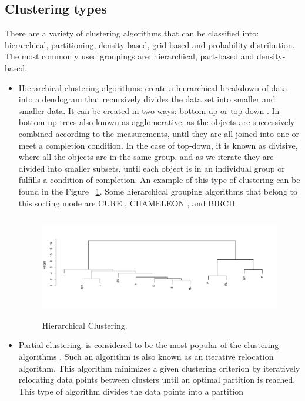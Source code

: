 \subsection{Clustering types}

There are a variety of clustering algorithms that can be classified into: hierarchical, partitioning, density-based, grid-based and probability distribution. The most commonly used groupings are: hierarchical, part-based and density-based.
\\
\begin{itemize}
  \item Hierarchical clustering algorithms: create a hierarchical breakdown of data into a dendogram that recursively divides the data set into smaller and smaller data. It can be created in two ways: bottom-up or top-down \citep{b19}. In bottom-up trees also known as agglomerative, as the objects are successively combined according to the measurements, until they are all joined into one or meet a completion condition.  In the case of top-down, it is known as divisive, where all the objects are in the same group, and as we iterate they are divided into smaller subsets, until each object is in an individual group or fulfills a condition of completion. An example of this type of clustering can be found in the Figure ~\ref{fig:hierarchical}. Some hierarchical grouping algorithms that belong to this sorting mode are CURE \citep{b20}, CHAMELEON \citep{b21}, and BIRCH \citep{b22}.
\begin{figure}[htbp]
  \centering
   \includegraphics[width=14cm, height=4.5cm]{img/hierarchical.pdf}
    \caption{Hierarchical Clustering.}
    \label{fig:hierarchical}%
\end{figure}
  \item Partial clustering: is considered to be the most popular of the clustering algorithms \citep{b23}. Such an algorithm is also known as an iterative relocation algorithm. This algorithm minimizes a given clustering criterion by iteratively relocating data points between clusters until an optimal partition is reached. This type of algorithm divides the data points into a partition

\end{itemize}

